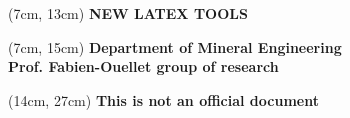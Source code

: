 \documentclass[12pt, a4paper, oneside]{article}
\newcommand{\origin}{Department of Mineral Engineering \\ 
Prof. Fabien-Ouellet group of research}
\newcommand{\documentnamecaps}{NEW LATEX TOOLS}
\begin{document}
\begin{titlepage}
	\begin{textblock*}{13cm}(7cm, 13cm)
		{\bfseries\Huge
    		\color{black}
    		\flushright
    		{\fontsize{40}{40}\selectfont \documentnamecaps}
		}   
	\end{textblock*}

	\begin{textblock*}{13cm}(7cm, 15cm)
		{\bfseries
			\vspace{-0.1cm}
			\color{red}
			\flushright
			\normalsize
			\origin\\
		}   
	\end{textblock*}

	\begin{textblock*}{10cm}(14cm, 27cm)
		{\bfseries\small
  		  	\color{black}
  		  	\flushright
			This is not an official document
		}
	\end{textblock*}

    \vspace*{\baselineskip}
\end{titlepage}

\begingroup
    \fontsize{14pt}{18pt}\selectfont
    \newpage
    \renewcommand{\contentsname}{\bfseries\Large\color{black} TABLE OF CONTENTS\hfill}   
    \makeatletter
    \renewcommand{\l@section}{\bfseries\@dottedtocline{1}{0em}{2em}}
	\renewcommand{\l@subsection}{\mdseries\@dottedtocline{2}{0.5em}{2.5em}}
	\renewcommand{\l@subsubsection}{\@dottedtocline{3}{1.0em}{3.5em}}
    \makeatother
    \flushleft
    \tableofcontents
    \newpage
\endgroup

\begingroup
	\renewcommand{\listtablename}{\color{black} LIST OF TABLES}
	\renewcommand{\listfigurename}{\color{black} LIST OF FIGURES}
	\listoftables
	\listoffigures
	\newpage
\endgroup




\justify
\renewcommand{\arraystretch}{1.2}
\setlength{\parindent}{0pt}
\setlength{\parskip}{7.68pt}
\end{document}
